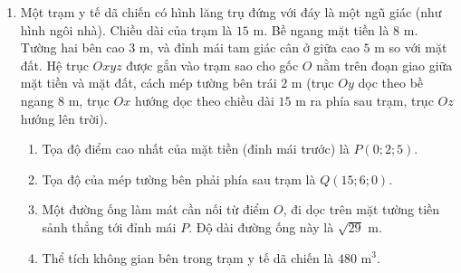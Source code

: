\documentclass[12pt]{article}
\begin{document}
\begin{enumerate}[label=\textbf{Câu \arabic*:}, leftmargin=*]
\begin{figure}[H]
		\end{figure}
		
		\begin{enumerate}[label=\alph*)]
			\item Tọa độ của điểm đỉnh mái $N$ nằm ở phía sau nhà xưởng là $(-15; 5; 9)$.
			\item Vectơ $\overrightarrow{OC}$ có tọa độ là $(-15; 10; 0)$.
			\item Người ta muốn kéo một đường dây cáp điện từ gốc $O$, đi bám sát mặt sàn dọc theo đoạn $OA$, leo thẳng đứng lên đỉnh $A'$, rồi đi bám trên mặt phẳng mái dốc tới đỉnh $M$. Chiều dài tối thiểu của đoạn cáp này là $11 + \sqrt{34} \text{ m}$.
			\item Toàn bộ hai mặt mái của xưởng được lợp bằng tôn chống nóng. Giá thi công trọn gói mỗi mét vuông tôn là $200.000$ đồng. Số tiền cần bỏ ra để lợp mái xưởng là $40.000.000$ đồng.
		\end{enumerate}
		
		\vspace{3mm}
		\item Một trạm y tế dã chiến có hình lăng trụ đứng với đáy là một ngũ giác (như hình ngôi nhà). Chiều dài của trạm là $15\text{ m}$. Bề ngang mặt tiền là $8\text{ m}$. Tường hai bên cao $3\text{ m}$, và đỉnh mái tam giác cân ở giữa cao $5\text{ m}$ so với mặt đất. Hệ trục $Oxyz$ được gắn vào trạm sao cho gốc $O$ nằm trên đoạn giao giữa mặt tiền và mặt đất, cách mép tường bên trái $2\text{ m}$ (trục $Oy$ dọc theo bề ngang $8\text{ m}$, trục $Ox$ hướng dọc theo chiều dài $15\text{ m}$ ra phía sau trạm, trục $Oz$ hướng lên trời).
		\begin{enumerate}[label=\alph*)]
			\item Tọa độ điểm cao nhất của mặt tiền (đỉnh mái trước) là $P(0; 2; 5)$.
			\item Tọa độ của mép tường bên phải phía sau trạm là $Q(15; 6; 0)$.
			\item Một đường ống làm mát cần nối từ điểm $O$, đi dọc trên mặt tường tiền sảnh thẳng tới đỉnh mái $P$. Độ dài đường ống này là $\sqrt{29}\text{ m}$.
			\item Thể tích không gian bên trong trạm y tế dã chiến là $480 \text{ m}^3$.
		\end{enumerate}
		

\end{enumerate}
\end{document}
